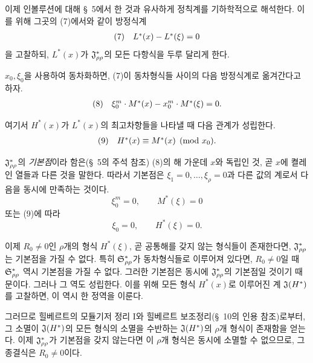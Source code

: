 이제 인볼루션에 대해 \S\ 5에서 한 것과 유사하게 정칙계를 기하학적으로 해석한다. 이를 위해 그곳의 (7)에서와 같이 방정식계
\[
\begin{array}{@{}l@{\quad}c@{}}
(7)& L^*(x)-L^*(\xi)=0
\end{array}
\]
을 고찰하되, $L^*(x)$가 $\mathfrak J^*_{\rho\rho}$의 모든 다항식을 두루 달리게 한다.

$x_0,\xi_0$을 사용하여 동차화하면, (7)이 동차형식들 사이의 다음 방정식계로 옮겨간다고 하자.
\[
\begin{array}{@{}l@{\quad}c@{}}
(8)& \xi_0^m\cdot M^*(x)-x_0^m\cdot M^*(\xi)=0.
\end{array}
\]

여기서 $H^*(x)$가 $L^*(x)$의 최고차항들을 나타낼 때 다음 관계가 성립한다.
\[
\begin{array}{@{}l@{\quad}c@{}}
(9)& H^*(x)\equiv M^*(x)\pmod{x_0}.
\end{array}
\]

$\mathfrak J^*_{\rho\rho}$의 \emph{기본점}이라 함은(\S\ 5의 주석 참조) (8)의 해 가운데 $x$와 독립인 것, 곧 $x$에 켤레인 열들과 다른 것을 말한다. 따라서 기본점은 $\xi_1=0,\ldots,\xi_\rho=0$과 다른 값의 계로서 다음을 동시에 만족하는 것이다.
\[
\xi_0^m=0,
\qquad M^*(\xi)=0
\]
또는 (9)에 따라
\[
\xi_0=0,
\qquad H^*(\xi)=0.
\]

이제 $R_0\ne0$인 $\rho$개의 형식 $H^*(\xi)$, 곧 공통해를 갖지 않는 형식들이 존재한다면, $\mathfrak J^*_{\rho\rho}$는 기본점을 가질 수 없다. 특히 $\mathfrak S^*_{\rho\rho}$가 동차형식들로 이루어져 있다면, $R_0\ne0$일 때 $\mathfrak S^*_{\rho\rho}$ 역시 기본점을 가질 수 없다. 그러한 기본점은 동시에 $\mathfrak J^*_{\rho\rho}$의 기본점일 것이기 때문이다. 그러나 그 역도 성립한다. 이를 위해 모든 형식 $H^*(x)$로 이루어진 계 $\mathfrak J(H^*)$를 고찰하면, 이 역시 한 정역을 이룬다.

그러므로 힐베르트의 모듈기저 정리 I와 힐베르트 보조정리(\S\ 10의 인용 참조)로부터, 그 소멸이 $\mathfrak J(H^*)$의 모든 형식의 소멸을 수반하는 $\mathfrak J(H^*)$의 $\rho$개 형식이 존재함을 얻는다. 이제 $\mathfrak J^*_{\rho\rho}$가 기본점을 갖지 않는다면 이 $\rho$개 형식은 동시에 소멸할 수 없으므로, 그 종결식은 $R_0\ne0$이다.


